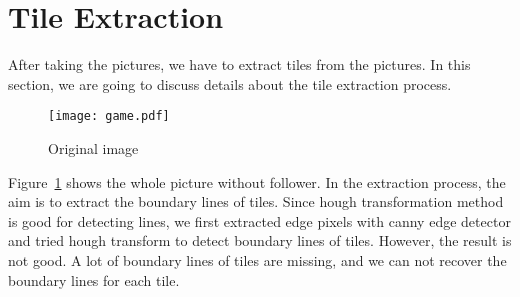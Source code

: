 \section{Tile Extraction}
\label{sec:extract}
After taking the pictures, we have to extract tiles from the pictures.
In this section, we are going to discuss details about the tile 
extraction process.


\begin{figure}[htbp]
	  \centering
	  \texttt{[image: game.pdf]}
	  \caption{Original image}
	  \label{Original_im}
\end{figure}

Figure~\ref{Original_im} shows the whole picture without follower. 
In the extraction process, the aim is to extract the boundary lines of 
tiles. Since hough transformation method is good for detecting lines, we
first extracted edge pixels with canny edge detector and tried hough 
transform to detect boundary lines of tiles. However, the result is not 
good. A lot of boundary lines of tiles are missing, and we can not recover 
the boundary lines for each tile.

